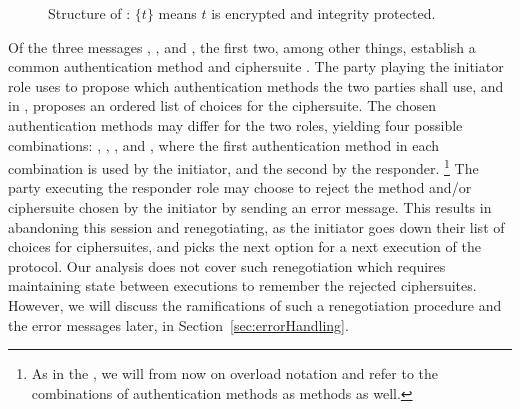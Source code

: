 %
\begin{figure}[ht]
\centering
{}
    \caption{Structure of \mEdhoc{}: $\{t\}$ means $t$ is encrypted and integrity
protected.~\cite{Norr21}}
\label{fig:edhocFramework}
\end{figure}
%
Of the three messages \mMsgone, \mMsgtwo, and \mMsgthree, the first two, among other things, establish a
common authentication method \mMethod{} and ciphersuite \mSuites{}.
%
The party playing the initiator role uses \mMethod{} to propose which
authentication methods the two parties shall use, and in \mSuites{}, proposes an ordered list
of choices for the ciphersuite.
%
The chosen authentication methods may differ for the two roles,
yielding four possible
combinations: \mSigSig{}, \mSigStat{}, \mStatSig{}, and \mStatStat{},
where the first authentication method in each combination is used by the
initiator, and the second by the responder.
\footnote{As in the \mSpec{}, we will from now on overload
notation and refer to the combinations of authentication methods as methods
as
well.}
%
The party executing the responder role may choose to reject the method and/or
ciphersuite chosen by the initiator by sending an error message.
%
This results in abandoning this session and renegotiating, as the initiator
goes down their list of choices for ciphersuites, and picks the next option for
a next execution of the protocol.
%
Our analysis does not cover such renegotiation which requires maintaining
state
between executions to remember the rejected ciphersuites.
%
However, we will discuss the ramifications of such a renegotiation procedure
and the error messages later, in Section~\ref{sec:errorHandling}.
%


